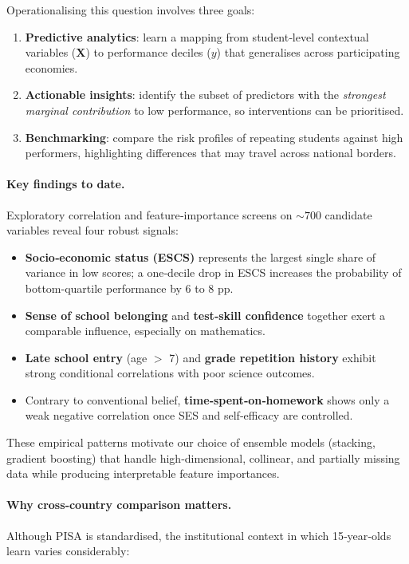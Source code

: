 \documentclass[final,5p,times,twocolumn,authoryear]{elsarticle}
\begin{document}
Operationalising this question involves three goals:

\begin{enumerate}
  \item \textbf{Predictive analytics}: learn a mapping from student‑level contextual variables ($\mathbf{X}$) to performance deciles ($y$) that generalises across participating economies.
  \item \textbf{Actionable insights}: identify the subset of predictors with the \emph{strongest marginal contribution} to low performance, so interventions can be prioritised.
  \item \textbf{Benchmarking}: compare the risk profiles of repeating students against high performers, highlighting differences that may travel across national borders.
\end{enumerate}

\paragraph{Key findings to date.}
Exploratory correlation and feature‑importance screens on $\sim700$ candidate variables reveal four robust signals:

\begin{itemize}
  \item \textbf{Socio‑economic status (ESCS)} represents the largest single share of variance in low scores; a one‑decile drop in ESCS increases the probability of bottom-quartile performance by 6 to 8 pp.
  \item \textbf{Sense of school belonging} and \textbf{test‑skill confidence} together exert a comparable influence, especially on mathematics.
  \item \textbf{Late school entry} (age $>$ 7) and \textbf{grade repetition history} exhibit strong conditional correlations with poor science outcomes.
  \item Contrary to conventional belief, \textbf{time‑spent‑on‑homework} shows only a weak negative correlation once SES and self‑efficacy are controlled.
\end{itemize}

These empirical patterns motivate our choice of ensemble models (stacking, gradient boosting) that handle high‑dimensional, collinear, and partially missing data while producing interpretable feature importances.

\paragraph{Why cross‑country comparison matters.}
Although PISA is standardised, the institutional context in which 15‑year‑olds learn varies considerably:
\end{document}
